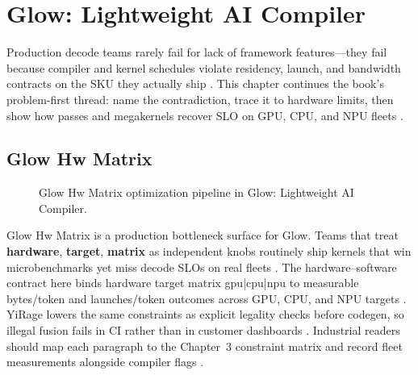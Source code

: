 \chapter{Glow: Lightweight AI Compiler}
\label{chap:ch19}

Production decode teams rarely fail for lack of framework features---they fail because compiler and kernel schedules violate residency, launch, and bandwidth contracts on the SKU they actually ship \citep{patel2025llminference,nvidia2022hopper}. This chapter continues the book's problem-first thread: name the contradiction, trace it to hardware limits, then show how passes and megakernels recover SLO on GPU, CPU, and NPU fleets \citep{taxbreak2026,semianalysis2024tma}.

\section{Glow Hw Matrix}
\label{sec:glow_hw_matrix}
\begin{figure}[t]
\centering
{}
\caption{Glow Hw Matrix optimization pipeline in Glow: Lightweight AI Compiler.}
\label{fig:glow_hw_matrix_pipeline}
\end{figure}


Glow Hw Matrix is a production bottleneck surface for Glow. Teams that treat \textbf{hardware}, \textbf{target}, \textbf{matrix} as independent knobs routinely ship kernels that win microbenchmarks yet miss decode SLOs on real fleets \citep{patel2025llminference,nvidia2022hopper}. The hardware--software contract here binds hardware target matrix gpu|cpu|npu to measurable bytes/token and launches/token outcomes across GPU, CPU, and NPU targets \citep{taxbreak2026,semianalysis2024tma}. YiRage lowers the same constraints as explicit legality checks before codegen, so illegal fusion fails in CI rather than in customer dashboards \citep{memoryfloor2026,amd2024xdna}. Industrial readers should map each paragraph to the Chapter~3 constraint matrix and record fleet measurements alongside compiler flags \citep{nvidia2022hopper,amd2024aie}.

